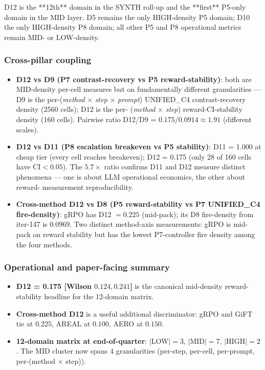 D12 is the **12th** domain in the SYNTH roll-up and the **first** P5-only
domain in the MID layer.  D5 remains the only HIGH-density P5 domain;
D10 the only HIGH-density P8 domain; all other P5 and P8 operational
metrics remain MID- or LOW-density.

\subsubsection{Cross-pillar coupling}

\begin{itemize}
\item \textbf{D12 vs D9 (P7 contrast-recovery vs P5 reward-stability)}:
  both are MID-density per-cell measures but on fundamentally different
  granularities --- D9 is the per-(\textit{method} $\times$ \textit{step} $\times$ \textit{prompt})
  UNIFIED\_C4 contrast-recovery density (2560 cells); D12 is the per-
  (\textit{method} $\times$ \textit{step}) reward-CI-stability density (160
  cells).  Pairwise ratio D12/D9 = $0.175 / 0.0914 \approx 1.91$
  (different scales).
\item \textbf{D12 vs D11 (P8 escalation breakeven vs P5 stability)}:
  D11 = 1.000 at cheap tier (every cell reaches breakeven);
  D12 = 0.175 (only 28 of 160 cells have $\text{CI} < 0.05$).  The
  $5.7\times$ ratio confirms D11 and D12 measure distinct phenomena ---
  one is about LLM operational economics, the other about reward-
  measurement reproducibility.
\item \textbf{Cross-method D12 vs D8 (P5 reward-stability vs P7
  UNIFIED\_C4 fire-density)}: gRPO has D12 $= 0.225$ (mid-pack); its
  D8 fire-density from iter-147 is $0.0969$.  Two distinct
  method-axis measurements: gRPO is mid-pack on reward stability
  but has the lowest P7-controller fire density among the four
  methods.
\end{itemize}

\subsubsection{Operational and paper-facing summary}

\begin{itemize}
\item \textbf{D12 = 0.175 [Wilson $0.124, 0.241$]} is the canonical
mid-density reward-stability headline for the 12-domain matrix.
\item \textbf{Cross-method D12} is a useful additional discriminator:
  gRPO and GiFT tie at $0.225$, AREAL at $0.100$, AERO at $0.150$.
\item \textbf{12-domain matrix at end-of-quarter}: $|$LOW$| = 3$,
  $|$MID$| = 7$, $|$HIGH$| = 2$.  The MID cluster now spans 4
  granularities (per-step, per-cell, per-prompt, per-(method × step)).
\end{itemize}

